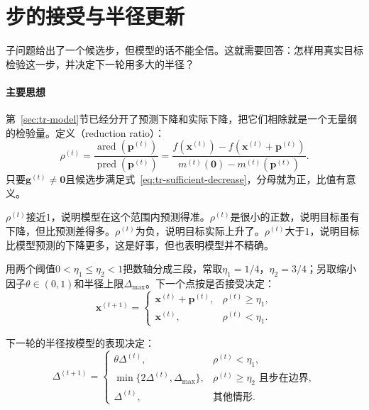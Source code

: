\section{步的接受与半径更新}
\label{sec:tr-acceptance}

子问题给出了一个候选步，但模型的话不能全信。这就需要回答：怎样用真实目标检验这一步，并决定下一轮用多大的半径？

\paragraph{主要思想}
第~\ref{sec:tr-model}节已经分开了预测下降和实际下降，把它们相除就是一个无量纲的检验量。定义（reduction ratio）：
\begin{equation}
 \rho^{(t)}=\frac{\operatorname{ared}(\bm{p}^{(t)})}{\operatorname{pred}(\bm{p}^{(t)})}
 =\frac{f(\bm{x}^{(t)})-f(\bm{x}^{(t)}+\bm{p}^{(t)})}{m^{(t)}(\bm{0})-m^{(t)}(\bm{p}^{(t)})}.
 \label{eq:tr-rho}
\end{equation}
只要$\bm{g}^{(t)}\neq\bm{0}$且候选步满足式~\eqref{eq:tr-sufficient-decrease}，分母就为正，比值有意义。

$\rho^{(t)}$接近$1$，说明模型在这个范围内预测得准。$\rho^{(t)}$是很小的正数，说明目标虽有下降，但比预测差得多。$\rho^{(t)}$为负，说明目标实际上升了。$\rho^{(t)}$大于$1$，说明目标比模型预测的下降更多，这是好事，但也表明模型并不精确。

用两个阈值$0<\eta_1\leq\eta_2<1$把数轴分成三段，常取$\eta_1=1/4$，$\eta_2=3/4$；另取缩小因子$\theta\in(0,1)$和半径上限$\Delta_{\max}$。下一个点按是否接受决定：
\begin{equation}
 \bm{x}^{(t+1)}=
 \begin{cases}
  \bm{x}^{(t)}+\bm{p}^{(t)},&\rho^{(t)}\geq\eta_1,\\
  \bm{x}^{(t)},&\rho^{(t)}<\eta_1.
 \end{cases}
 \label{eq:tr-accept}
\end{equation}

下一轮的半径按模型的表现决定：
\begin{equation}
 \Delta^{(t+1)}=
 \begin{cases}
  \theta\Delta^{(t)},&\rho^{(t)}<\eta_1,\\
  \min\{2\Delta^{(t)},\Delta_{\max}\},&\rho^{(t)}\geq\eta_2\text{ 且步在边界},\\
  \Delta^{(t)},&\text{其他情形}.
 \end{cases}
 \label{eq:tr-radius}
\end{equation}

